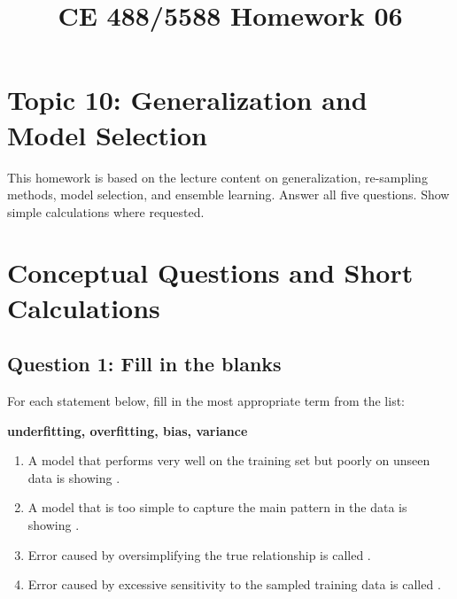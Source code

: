 \documentclass[12pt]{article}
\begin{document}
\title{CE 488/5588 Homework 06\\
\vspace{2in}
\author{}
}
\maketitle
\newpage

\section*{Topic 10: Generalization and Model Selection}

\begin{ch-box}
This homework is based on the lecture content on generalization, re-sampling methods,
model selection, and ensemble learning. Answer all five questions. Show simple calculations
where requested.
\end{ch-box}

\section*{Conceptual Questions and Short Calculations}

\subsection*{Question 1: Fill in the blanks}
For each statement below, fill in the most appropriate term from the list:

\begin{center}
\textbf{underfitting, overfitting, bias, variance}
\end{center}

\begin{enumerate}[label=(\alph*)]
    \item A model that performs very well on the training set but poorly on unseen data is showing \underline{\hspace{3cm}}.
    \item A model that is too simple to capture the main pattern in the data is showing \underline{\hspace{3cm}}.
    \item Error caused by oversimplifying the true relationship is called \underline{\hspace{3cm}}.
    \item Error caused by excessive sensitivity to the sampled training data is called \underline{\hspace{3cm}}.
\end{enumerate}
\end{document}
